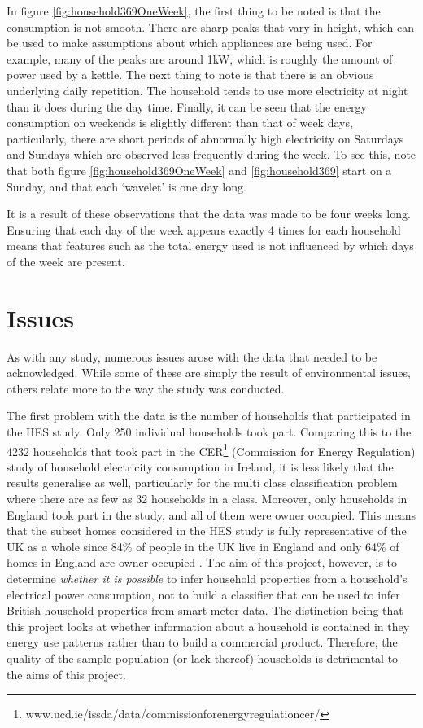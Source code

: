 In figure \ref{fig:household369OneWeek}, the first thing to be noted is that the consumption is not smooth. There are sharp peaks that vary in height, which can be used to make assumptions about which appliances are being used. For example, many of the peaks  are around 1kW, which is roughly the amount of power used by a kettle. The next thing to note is that there is an obvious underlying daily repetition. The household tends to use more electricity at night than it does during the day time. Finally, it can be seen that the energy consumption on weekends is slightly different than that of week days, particularly, there are short periods of abnormally high electricity on Saturdays and Sundays which are observed less frequently during the week. To see this, note that both figure \ref{fig:household369OneWeek} and \ref{fig:household369} start on a Sunday, and that each `wavelet' is one day long.

It is a result of these observations that the data was made to be four weeks long. Ensuring that each day of the week appears exactly 4 times for each household means that features such as the total energy used is not influenced by which days of the week are present.

\householdOneWeek
\householdPlot




\section{Issues}

As with any study, numerous issues arose with the data that needed to be acknowledged. While some of these are simply the result of environmental issues, others relate more to the way the study was conducted.

The first problem with the data is the number of households that participated in the HES study. Only 250 individual households took part. Comparing this to the 4232 households that took part in the CER\footnote{www.ucd.ie/issda/data/commissionforenergyregulationcer/} (Commission for Energy Regulation) study of household electricity consumption in Ireland, it is less likely that the results generalise as well, particularly for the multi class classification problem where there are as few as 32 households in a class. Moreover, only households in England took part in the study, and all of them were owner occupied. This means that the subset homes considered in the HES study is fully representative of the UK as a whole since 84\% of people in the UK live in England and only 64\% of homes in England are owner occupied \cite{ONS}. The aim of this project, however, is to determine \textit{whether it is possible} to infer household properties from a household's electrical power consumption, not to build a classifier that can be used to infer British household properties from smart meter data. The distinction being that this project looks at whether information about a household is contained in they energy use patterns rather than to build a commercial product. Therefore, the quality of the sample population (or lack thereof) households is detrimental to the aims of this project.

